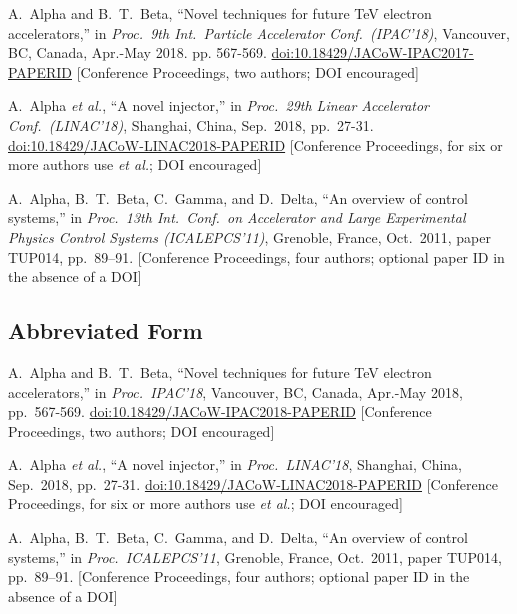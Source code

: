\newcommand{\CCom}[2]{\newline\textcolor{#1}{[#2]}}
\begin{thebibliography}{9} %
	
	A.~Alpha and B.~T.~Beta, “Novel techniques for future TeV electron accelerators,”
	in \textit{Proc.\ 9th Int.\ Particle Accelerator Conf.\ (IPAC’18)},
	Vancouver, BC, Canada, Apr.-May 2018.
	pp. 567-569. \url{doi:10.18429/JACoW-IPAC2017-PAPERID}
	\CCom{jgreen}{Conference Proceedings, two authors; DOI encouraged}

	A.~Alpha \emph{et al.},
	“A novel injector,” in \emph{Proc.\ 29th Linear Accelerator Conf.\ (LINAC’18)},
	Shanghai, China, Sep.\ 2018, pp.\ 27-31. %
	\url{doi:10.18429/JACoW-LINAC2018-PAPERID}
	\CCom{jgreen}{Conference Proceedings, for six or more authors use \emph{et al.};	
		 DOI encouraged}
	
	A.~Alpha, B.~T.~Beta, C.~Gamma, and D.~Delta,
	“An overview of control systems,”
	in \emph{Proc.\ 13th Int.\ Conf.\ on Accelerator and Large Experimental Physics Control Systems (ICALEPCS’11)}, Grenoble, France, Oct.\ 2011,
	paper TUP014, pp.\ 89--91.
	\CCom{jgreen}{Conference Proceedings, four authors; optional paper ID
	in the absence of a DOI}
\end{thebibliography}

\vspace*{-.5\baselineskip}
\subsection{Abbreviated Form}

\begin{thebibliography}{9} %
	A.~Alpha and B.~T.~Beta, “Novel techniques for future TeV electron accelerators,”
	in \textit{Proc.\ IPAC’18}, Vancouver, BC, Canada, Apr.-May 2018,
	pp.\ 567-569. %
	\url{doi:10.18429/JACoW-IPAC2018-PAPERID}
	\CCom{jgreen}{Conference Proceedings, two authors; DOI encouraged}
	
	A.~Alpha \emph{et al.},
	“A novel injector,” in \emph{Proc.\ LINAC’18},
	Shanghai, China, Sep.\ 2018, pp.\ 27-31. %
	\url{doi:10.18429/JACoW-LINAC2018-PAPERID}
	\CCom{jgreen}{Conference Proceedings, for six or more authors use \emph{et al.}; DOI encouraged}
	
	A.~Alpha, B.~T.~Beta, C.~Gamma, and D.~Delta,
	“An overview of control systems,”
	in \emph{Proc.\ ICALEPCS’11}, Grenoble, France, Oct.\ 2011,
	paper TUP014, pp.\ 89--91.
	\CCom{jgreen}{Conference Proceedings, four authors; optional paper ID
				  in the absence of a DOI}
\end{thebibliography}

